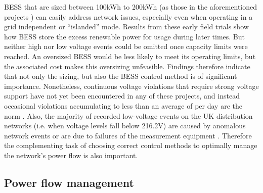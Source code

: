 BESS that are sized between 100kWh to 200kWh (as those in the aforementioned projects \cite{Wade2010, Wade2009, Overbeeke2010, GROWDERS2011}) can easily address network issues, especially even when operating in a grid independent or ``islanded'' mode.
Results from these early field trials show how BESS store the excess renewable power for usage during later times.
But neither high nor low voltage events could be omitted once capacity limits were reached.
An oversized BESS would be less likely to meet its operating limits, but the associated cost makes this oversizing unfeasible.
Findings therefore indicate that not only the sizing, but also the BESS control method is of significant importance.
Nonetheless, continuous voltage violations that require strong voltage support have not yet been encountered in any of these projects, and instead occasional violations accumulating to less than an average of per day are the norm \cite{Sugihara2013}.
Also, the majority of recorded low-voltage events on the UK distribution networks (i.e. when voltage levels fall below 216.2V) are caused by anomalous network events or are due to failures of the measurement equipment \cite{UKPowerNetworks2014a}.
Therefore the complementing task of choosing correct control methods to optimally manage the network's power flow is also important.

\subsection{Power flow management}
\label{ch-literature:subsec:power-flow-management}

